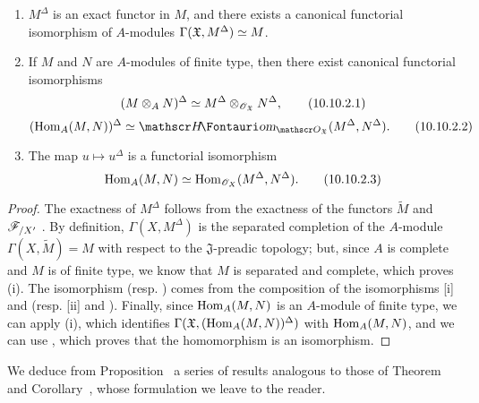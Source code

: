\begin{proposition}[10.10.2]
\label{1.10.10.2}
\medskip\noindent
\begin{enumerate}[label=\emph{(\roman*)}]
  \item $M^\Delta$ is an exact functor in $M$, and there exists a canonical functorial isomorphism of $A$-modules $\Gamma(\mathfrak{X},M^\Delta)\simeq M$.
  \item If $M$ and $N$ are $A$-modules of finite type, then there exist canonical functorial isomorphisms
    \begin{equation*}
    \label{1.10.10.2.1}
      (M\otimes_A N)^\Delta\simeq M^\Delta\otimes_{\mathscr{O}_\mathfrak{X}}N^\Delta,
      \tag{10.10.2.1}
    \end{equation*}
    \begin{equation*}
    \label{1.10.10.2.2}
      (\Hom_A(M,N))^\Delta\isoto\shHom_{\sh{O}_\mathfrak{X}}(M^\Delta,N^\Delta).
      \tag{10.10.2.2}
    \end{equation*}
  \item The map $u\mapsto u^\Delta$ is a functorial isomorphism
    \begin{equation*}
    \label{1.10.10.2.3}
      \operatorname{Hom}_A(M,N)\simeq\operatorname{Hom}_{\mathscr{O}_X}(M^\Delta,N^\Delta).
      \tag{10.10.2.3}
    \end{equation*}
\end{enumerate}
\end{proposition}

\begin{proof}
\label{proof-1.10.10.2}
The exactness of $M^\Delta$ follows from the exactness of the functors $\widetilde{M}$  and $\mathscr{F}_{/X'}$ .
By definition, $\Gamma(X,M^\Delta)$ is the separated completion of the $A$-module $\Gamma(X,\widetilde{M})=M$ with respect to the $\mathfrak{J}$-preadic topology; but, since $A$ is complete and $M$ is of finite type, we know  that $M$ is separated and complete, which proves (i).
The isomorphism  (resp. ) comes from the composition of the isomorphisms [i] and  (resp. [ii] and ).
Finally, since $\operatorname{Hom}_A(M,N)$ is an $A$-module of finite type, we can apply (i), which identifies $\Gamma(\mathfrak{X},(\operatorname{Hom}_A(M,N))^\Delta)$ with $\operatorname{Hom}_A(M,N)$, and we can use , which proves that the homomorphism  is an isomorphism.
\end{proof}

We deduce from Proposition~ a series of results analogous to those of Theorem~ and Corollary~, whose formulation we leave to the reader.

